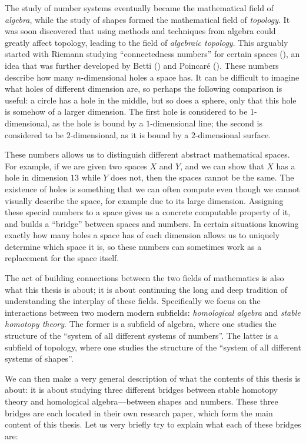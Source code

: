 The study of number systems eventually became the mathematical field of \emph{algebra}, while the study of shapes formed the mathematical field of \emph{topology}. It was soon discovered that using methods and techniques from algebra could greatly affect topology, leading to the field of \emph{algebraic topology}. This arguably started with Riemann studying ``connectedness numbers'' for certain spaces (\cite{riemann_1857}), an idea that was further developed by Betti (\cite{betti_1870}) and Poincaré (\cite{poincare_1895}). These numbers describe how many $n$-dimensional holes a space has. It can be difficult to imagine what holes of different dimension are, so perhaps the following comparison is useful: a circle has a hole in the middle, but so does a sphere, only that this hole is somehow of a larger dimension. The first hole is considered to be $1$-dimensional, as the hole is bound by a $1$-dimensional line; the second is considered to be $2$-dimensional, as it is bound by a $2$-dimensional surface. 

These numbers allows us to distinguish different abstract mathematical spaces. For example, if we are given two spaces $X$ and $Y$, and we can show that $X$ has a hole in dimension $13$ while $Y$ does not, then the spaces cannot be the same. The existence of holes is something that we can often compute even though we cannot visually describe the space, for example due to its large dimension. Assigning these special numbers to a space gives us a concrete computable property of it, and builds a ``bridge'' between spaces and numbers. In certain situations knowing exactly how many holes a space has of each dimension allows us to uniquely determine which space it is, so these numbers can sometimes work as a replacement for the space itself. 

The act of building connections between the two fields of mathematics is also what this thesis is about; it is about continuing the long and deep tradition of understanding the interplay of these fields. Specifically we focus on the interactions between two modern modern subfields: \emph{homological algebra} and \emph{stable homotopy theory}. The former is a subfield of algebra, where one studies the structure of the ``system of all different systems of numbers''. The latter is a subfield of topology, where one studies the structure of the ``system of all different systems of shapes''. 

We can then make a very general description of what the contents of this thesis is about: it is about studying three different bridges between stable homotopy theory and homological algebra---between shapes and numbers. These three bridges are each located in their own research paper, which form the main content of this thesis. Let us very briefly try to explain what each of these bridges are: 

